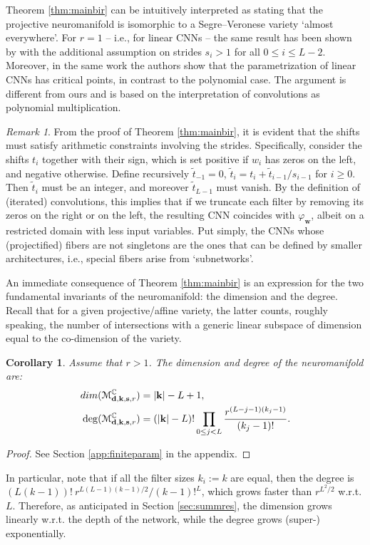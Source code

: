\documentclass[twoside]{article}
\theoremstyle{plain}%
\newtheorem{cor}[thm]{Corollary}
\theoremstyle{definition}
\theoremstyle{remark}
\newtheorem{rmk}{Remark}[section]
\begin{document}
Theorem \ref{thm:mainbir} can be intuitively interpreted as stating that the projective neuromanifold is isomorphic to a Segre--Veronese variety `almost everywhere'. For $r = 1$ -- i.e., for linear CNNs -- the same result has been shown by \cite{kohn2023function} with the additional assumption on strides $s_i > 1$ for all $0 \leq i \leq L - 2$. Moreover, in the same work the authors show that the parametrization of linear CNNs has critical points, in contrast to the polynomial case. The argument is different from ours and is based on the interpretation of convolutions as polynomial multiplication. 

\begin{rmk}\label{rmk:singsmall}
From the proof of Theorem \ref{thm:mainbir}, it is evident that the shifts must satisfy arithmetic constraints involving the strides. Specifically, consider the shifts $t_i$ together with their sign, which is set positive if $w_i$ has zeros on the left, and negative otherwise. Define recursively $\tilde{t}_{-1} = 0$, $\tilde{t}_i = t_i + \tilde{t}_{i-1} / s_{i-1}$ for $i \geq 0$. Then $\tilde{t}_i$ must be an integer, and moreover $\tilde{t}_{L-1}$ must vanish. By the definition of (iterated) convolutions, this implies that if we truncate each filter by removing its zeros on the right or on the left, the resulting CNN coincides with $\varphi_{\mathbf{w}}$, albeit on a restricted domain with less input variables. Put simply, the CNNs whose (projectified) fibers are not singletons are the ones that can be defined by smaller architectures, i.e., special
fibers arise from `subnetworks'.    
\end{rmk}

An immediate consequence of Theorem \ref{thm:mainbir} is an expression for the two fundamental invariants of the neuromanifold: the dimension and the degree. Recall that for a given projective/affine variety, the latter counts, roughly speaking, the number of intersections with a generic linear subspace of dimension equal to the co-dimension of the variety. 
\begin{cor}\label{cor:finiteparam}
Assume that $r>1$. The dimension and degree of the neuromanifold are: 
\begin{align}
    \textnormal{dim}(\mathcal{M}_{\mathbf{d}, \mathbf{k}, \mathbf{s}, r}^\mathbb{C}) &= |\mathbf{k}| - L + 1, \\
    \deg(\mathcal{M}_{\mathbf{d}, \mathbf{k}, \mathbf{s}, r}^\mathbb{C}) &= (|\mathbf{k}|-L)!\prod_{0 \leq j < L} \frac{r^{(L - j - 1)(k_j - 1)}}{(k_j - 1)!}.
\end{align}
\end{cor}
\begin{proof}
See Section \ref{app:finiteparam} in the appendix. 
\end{proof}
In particular, note that if all the filter sizes $k_i := k$ are equal, then the degree is $(L(k-1))! \ r^{L(L-1)(k-1) / 2 }/ (k-1)!^L$, which grows faster than $r^{L^2/2}$ w.r.t. $L$. Therefore, as anticipated in Section \ref{sec:summres}, the dimension grows linearly w.r.t. the depth of the network, while the degree grows (super-) exponentially.  
\end{document}
